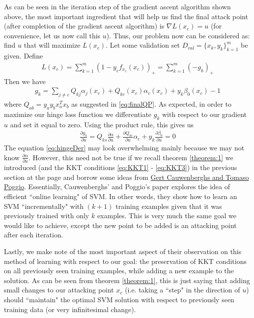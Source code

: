 \documentclass[twoside]{article}
\begin{document}
As can be seen in the iteration step of the gradient ascent algorithm shown above, the most important ingredient that will help us find the final attack point (after completion of the gradient ascent algorithm) is $\nabla{L(x_{c})} = u$ (for convenience, let us now call this $u$). Thus, our problem now can be considered as: find $u$ that will maximize $L(x_{c})$. Let some validation set $D_{val} = \{x_{k},y_{k}\}_{k=1}^{m}$ be given. Define
\begin{align*}
     L(x_c) = \sum_{k=1}^{m}(1-y_{c}f_{x_{c}}(x_{c}))_{+} = \sum_{k=1}^{m}(-g_{k})_{+}
\end{align*}
Then we have
\begin{align*}
    g_{k} = \sum_{j \neq c}Q_{kj}\alpha_{j}(x_{c}) + Q_{kc}(x_{c})\alpha_{c}(x_{c}) + y_{k}\beta_{0}(x_{c}) - 1
\end{align*}
where ${Q_{ab}} = y_{a}y_{b}x_{a}^{T}x_{b}$ as suggested in \textcolor{blue}{\ref{eq:finalQP}}. As expected, in order to maximize our hinge loss function we differentiate $g_k$ with respect to our gradient $u$ and set it equal to zero. Using the product rule, this gives us
\begin{align} \label{eq:hingeDer}
    \frac{\partial{g_{k}}}{\partial{u}} = Q_{ks}\frac{\partial{\alpha}}{\partial{u}} + \frac{\partial{Q_{kc}}}{\partial{u}}\alpha_{c} + y_{k}\frac{\partial{\beta_{0}}}{\partial{u}} = 0
\end{align}
The equation \textcolor{blue}{\ref{eq:hingeDer}} may look overwhelming mainly because we may not know $\frac{\partial{\alpha}}{\partial{u}}$. However, this need not be true if we recall theorem \textcolor{blue}{\ref{theorem:1}} we introduced (and the KKT conditions \textcolor{blue}{\ref{eq:KKT1}} - \textcolor{blue}{\ref{eq:KKT3}}) in the previous section at the page \textcolor{blue}{\pageref{theorem:1}} and borrow some ideas from \textcolor{blue}{\href{https://papers.nips.cc/paper/1814-incremental-and-decremental-support-vector-machine-learning.pdf}{Gert Cauwenberghs and Tomaso Poggio}}. Essentially, Cauwenberghs' and Poggio's paper explores the idea of efficient ``online learning" of SVM. In other words, they show how to learn an SVM ``incrementally" with $(k + 1)$ training examples given that it was previously trained with only $k$ examples. This is very much the same goal we would like to achieve, except the new point to be added is an attacking point after each iteration.

Lastly, we make note of the most important aspect of their observation on this method of learning with respect to our goal: the preservation of KKT conditions on all previously seen training examples, while adding a new example to the solution. As can be seen from theorem \textcolor{blue}{\ref{theorem:1}}, this is just saying that adding small changes to our attacking point $x_c$ (i.e. taking a ``step" in the direction of $u$) should ``maintain" the optimal SVM solution with respect to previously seen training data (or very infinitesimal change).
\end{document}
